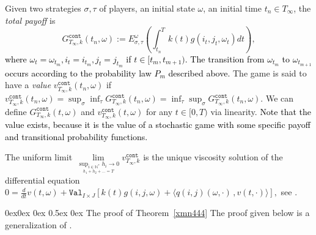 \documentclass[english,openary,12pt]{article}
\makeatletter
\renewcommand\subsubsection{\@startsection{subsubsection}{3}{\z@}%
                                     {0ex\@plus 0ex \@minus 0ex}%
                                     {0.5ex \@plus 0ex}%
                                     {\normalfont\large\bfseries}}%
\newcommand{\red}[1]{\textcolor{black}{#1}}
\theoremstyle{definition}
\newcommand{\N}{\mathbb{N}}
\makeatother
\begin{document}
Given two strategies $\sigma, \tau$ of players, an initial state $\omega$, an initial time $t_n \in T_\infty$,
the \emph{total payoff} is 
$$G^{\texttt{cont}}_{T_\infty,k}(t_n,\omega) := E_{\sigma,\tau}^{\omega}
\left(\int_{t_n}^{T} k(t) g(i_t,j_t, \omega_t) dt\right),$$ 
\red{where $\omega_t = \omega_{t_m}, i_t = i_{t_m}, j_t = j_{t_m}$ if $t \in [t_m, t_{m+1})$. The transition from $\omega_{t_m}$ to $\omega_{t_{m+1}}$ occurs according to the probability law $P_{m}$ described above.}
The game is said to have a 
\emph{value} $v^{\texttt{cont}}_{T_\infty,k}(t_n,\omega)$ if
$v^{\texttt{cont}}_{T_\infty,k}(t_n,\omega) = 
\sup_{\sigma} \inf_{\tau} G^{\texttt{cont}}_{T_\infty,k}(t_n,\omega) = 
\inf_{\tau} \sup_{\sigma} G^{\texttt{cont}}_{T_\infty,k}(t_n,\omega).$
We can define $G^{\texttt{cont}}_{T_\infty,k}(t,\omega)$ and 
$v^{\texttt{cont}}_{T_\infty,k}(t,\omega)$ for any $t\in [0,T)$ via linearity.
\red{Note that the value exists, because it is the value of a stochastic game with some specific payoff and transitional probability functions.}

The uniform limit
$\lim\limits_{\underset{h_1+h_2+\ldots = T}{\sup_{i\in\N^*} h_i \to 0}} 
v^{\texttt{cont}}_{T_\infty,k}$ is the unique viscosity solution of 
the differential equation
$0 = \frac{d}{dt} v(t,\omega) + \texttt{Val}_{I\times J} [k(t) g(i,j,\omega) + 
\langle q(i,j)(\omega,\cdot)\,, v(t,\cdot)\rangle],$ see \cite[Proposition~4.3]{Sor17}.

\subsubsection{The proof of Theorem~\ref{xmn444}}
The proof given below is a generalization of 
\cite[proofs of Lemma~8.1 and Proposition~8.1]{SorVig16}. 
\end{document}
